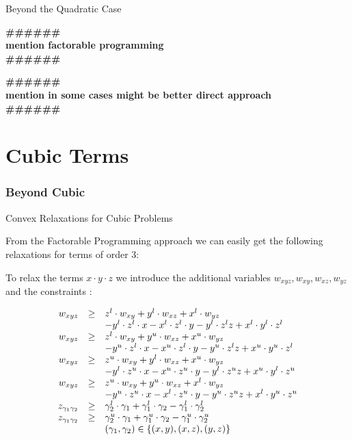 \documentclass{beamer}
\newcommand{\todo}[1]
{\begin{tiny}
  \begin{center} {\color{red}
  \textbf{ {\#\#\#\hfill\#\#\#}\\{#1}\\\#\#\#\hfill\#\#\#}}
\end{center}
\end{tiny}} %
\begin{document}
\begin{frame}{Beyond the Quadratic Case}

  \todo{mention factorable programming}

  \todo{mention in some cases might be better direct approach}

\end{frame}

\section{Cubic Terms} %
\label{sec:cubterms}

\subsubsection{Beyond Cubic} %
\label{ssub:boundcubic}

\begin{frame}{Convex Relaxations for Cubic Problems}

  From the Factorable Programming approach we can easily get the following relaxations for
  terms of order 3:

  To relax the terms $x \cdot y \cdot z$ we introduce the additional variables
  $w_{xyz}, w_{xy}, w_{xz}, w_{yz}$ and the constraints : 

  \begin{displaymath}
    \begin{array}[h]{rcl}
      w_{xyz} & \geq & z^l \cdot w_{xy}+ y^l \cdot w_{xz} + x^l \cdot w_{yz} \\
     &  & -y^l \cdot z^l \cdot x - x^l \cdot z^l \cdot y - y^l \cdot z^l z 
     + x^l \cdot y^l \cdot z^l \\
      w_{xyz} & \geq & z^l \cdot w_{xy}+ y^u \cdot w_{xz} + x^u \cdot w_{yz} \\
     &  & -y^u \cdot z^l \cdot x - x^u \cdot z^l \cdot y - y^u \cdot z^l z 
     + x^u \cdot y^u \cdot z^l \\
      w_{xyz} & \geq & z^u \cdot w_{xy}+ y^l \cdot w_{xz} + x^u \cdot w_{yz} \\
     &  & -y^l \cdot z^u \cdot x - x^u \cdot z^u \cdot y - y^l \cdot z^u z 
     + x^u \cdot y^l \cdot z^u \\
      w_{xyz} & \geq & z^u \cdot w_{xy}+ y^u \cdot w_{xz} + x^l \cdot w_{yz} \\
     &  & -y^u \cdot z^u \cdot x - x^l \cdot z^u \cdot y - y^u \cdot z^u z 
     + x^l \cdot y^u \cdot z^u \\
     z_{\gamma_1 \gamma_2} & \geq & \gamma_2^l \cdot \gamma_1 + \gamma_1^l \cdot \gamma_2
     - \gamma_1^l \cdot \gamma_2^l \\
     z_{\gamma_1 \gamma_2} & \geq & \gamma_2^u \cdot \gamma_1 + \gamma_1^u \cdot \gamma_2
     - \gamma_1^u \cdot \gamma_2^u \\
     &  &  (\gamma_1, \gamma_2) \in \left\{ (x,y), (x,z), (y,z) \right\} \\
    \end{array}
  \end{displaymath}
  
\end{frame}
\end{document}
